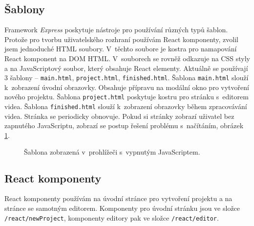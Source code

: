 \subsection{Šablony}
Framework \textit{Express} poskytuje nástroje pro používání různých typů šablon. Protože pro tvorbu uživatelského rozhraní používám React komponenty, zvolil jsem jednoduché HTML soubory. V~těchto soubore je kostra pro namapování React komponent na DOM HTML. V~souborech se rovněž odkazuje na CSS styly a na JavaScriptový soubor, který obsahuje React elementy. Aktuálně se používají 3 šablony -- \texttt{main.html}, \texttt{project.html}, \texttt{finished.html}. Šablona \texttt{main.html} slouží k~zobrazení úvodní obrazovky. Obsahuje přípravu na modální okno pro vytvoření nového projektu. Šablona \texttt{project.html} poskytuje kostru pro stránku s~editorem videa. Šablona \texttt{finished.html} slouží k~zobrazení obrazovky během zpracovávání videa. Stránka se periodicky obnovuje. Pokud si stránky zobrazí uživatel bez zapnutého JavaScriptu, zobrazí se postup řešení problému s~načítáním, obrázek \ref{img:loading-page}.
\begin{figure}[h]
	\centering
	\caption{Šablona zobrazená v~prohlížeči s~vypnutým JavaScriptem.}\label{img:loading-page}
\end{figure}

\subsection{React komponenty}
React komponenty používám na úvodní stránce pro vytvoření projektu a na stránce se samotným editorem. Komponenty pro úvodní stránku jsou ve složce \texttt{/react/newProject}, komponenty editory pak ve složce \texttt{/react/editor}.

